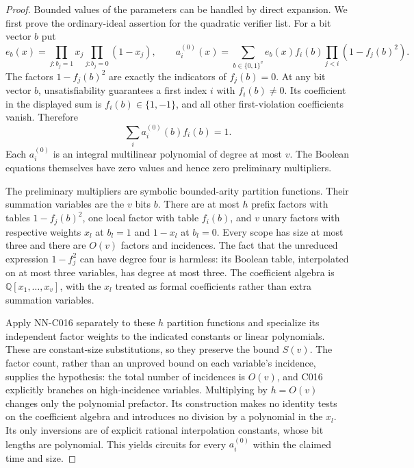 \begin{proof}
Bounded values of the parameters can be handled by direct expansion. We first prove the ordinary-ideal assertion for the quadratic verifier list. For a bit vector $b$ put
\[
 e_b(x)=\prod_{j:b_j=1}x_j\prod_{j:b_j=0}(1-x_j),
 \qquad
 a_i^{(0)}(x)=\sum_{b\in\{0,1\}^v}e_b(x)f_i(b)
                  \prod_{j<i}(1-f_j(b)^2).
\]
The factors $1-f_j(b)^2$ are exactly the indicators of $f_j(b)=0$. At any bit vector $b$, unsatisfiability guarantees a first index $i$ with $f_i(b)\ne0$. Its coefficient in the displayed sum is $f_i(b)\in\{1,-1\}$, and all other first-violation coefficients vanish. Therefore
\[
                    \sum_i a_i^{(0)}(b)f_i(b)=1.
\]
Each $a_i^{(0)}$ is an integral multilinear polynomial of degree at most $v$. The Boolean equations themselves have zero values and hence zero preliminary multipliers.

The preliminary multipliers are symbolic bounded-arity partition functions. Their summation variables are the $v$ bits $b$. There are at most $h$ prefix factors with tables $1-f_j(b)^2$, one local factor with table $f_i(b)$, and $v$ unary factors with respective weights $x_l$ at $b_l=1$ and $1-x_l$ at $b_l=0$. Every scope has size at most three and there are $O(v)$ factors and incidences. The fact that the unreduced expression $1-f_j^2$ can have degree four is harmless: its Boolean table, interpolated on at most three variables, has degree at most three. The coefficient algebra is $\mathbb Q[x_1,\ldots,x_v]$, with the $x_l$ treated as formal coefficients rather than extra summation variables.

Apply NN-C016 separately to these $h$ partition functions and specialize its independent factor weights to the indicated constants or linear polynomials. These are constant-size substitutions, so they preserve the bound $S(v)$. The factor count, rather than an unproved bound on each variable's incidence, supplies the hypothesis: the total number of incidences is $O(v)$, and C016 explicitly branches on high-incidence variables. Multiplying by $h=O(v)$ changes only the polynomial prefactor. Its construction makes no identity tests on the coefficient algebra and introduces no division by a polynomial in the $x_l$. Its only inversions are of explicit rational interpolation constants, whose bit lengths are polynomial. This yields circuits for every $a_i^{(0)}$ within the claimed time and size.


\end{proof}
